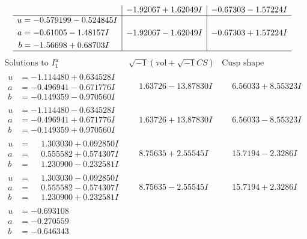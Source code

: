 \documentclass[1p]{elsarticle_modified}
\theoremstyle{definition}
\newcommand{\I}{\sqrt{-1}}
\begin{document}
$$\begin{array}{c|c|c}
 & -1.92067 + 1.62049 I & -0.67303 - 1.57224 I \\ \hline\begin{aligned}
u &= -0.579199 - 0.524845 I \\
a &= -0.61005 - 1.48157 I \\
b &= -1.56698 + 0.68703 I\end{aligned}
 & -1.92067 - 1.62049 I & -0.67303 + 1.57224 I\\
 \hline 
 \end{array}$$\newpage$$\begin{array}{c|c|c}  
\text{Solutions to }I^u_{1}& \I (\text{vol} + \sqrt{-1}CS) & \text{Cusp shape}\\
 \hline 
\begin{aligned}
u &= -1.114480 + 0.634528 I \\
a &= -0.496941 - 0.671776 I \\
b &= -0.149359 - 0.970560 I\end{aligned}
 & \phantom{-}1.63726 - 13.87830 I & \phantom{-}6.56033 + 8.55323 I \\ \hline\begin{aligned}
u &= -1.114480 - 0.634528 I \\
a &= -0.496941 + 0.671776 I \\
b &= -0.149359 + 0.970560 I\end{aligned}
 & \phantom{-}1.63726 + 13.87830 I & \phantom{-}6.56033 - 8.55323 I \\ \hline\begin{aligned}
u &= \phantom{-}1.303030 + 0.092850 I \\
a &= \phantom{-}0.555582 + 0.574307 I \\
b &= \phantom{-}1.230900 - 0.232581 I\end{aligned}
 & \phantom{-}8.75635 + 2.55545 I & \phantom{-}15.7194 - 2.3286 I \\ \hline\begin{aligned}
u &= \phantom{-}1.303030 - 0.092850 I \\
a &= \phantom{-}0.555582 - 0.574307 I \\
b &= \phantom{-}1.230900 + 0.232581 I\end{aligned}
 & \phantom{-}8.75635 - 2.55545 I & \phantom{-}15.7194 + 2.3286 I \\ \hline\begin{aligned}
u &= -0.693108\phantom{ +0.000000I} \\
a &= -0.270559\phantom{ +0.000000I} \\
b &= -0.646343\phantom{ +0.000000I}\end{aligned}

\end{array}$$
\end{document}
